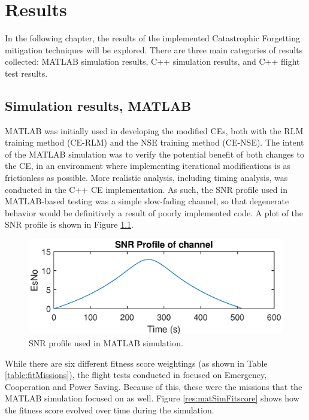 \chapter{Results}\label{ch:results}

\par In the following chapter, the results of the implemented Catastrophic Forgetting mitigation techniques will be explored. There are three main categories of results collected: MATLAB simulation results, C++ simulation results, and C++ flight test results. %
\section{Simulation results, MATLAB}
\par MATLAB was initially used in developing the modified CEs, both with the RLM training method (CE-RLM) and the NSE training method (CE-NSE). The intent of the MATLAB simulation was to verify the potential benefit of both changes to the CE, in an environment where implementing iterational modifications is as frictionless as possible. More realistic analysis, including timing analysis, was conducted in the C++ CE implementation. As such, the SNR profile used in MATLAB-based testing was a simple slow-fading channel, so that degenerate behavior would be definitively a result of poorly implemented code. A plot of the SNR profile is shown in Figure \ref{fig:matlabSNRProf}. 
\begin{figure}[ht]
\centering
\includegraphics[scale=1]{figures/matlab_sim_results/snrPRofile_matlabsim.eps}
\caption{SNR profile used in MATLAB simulation.}
\label{fig:matlabSNRProf}
\end{figure}
\par While there are six different fitness score weightings (as shown in Table \ref{table:fitMissions}), the flight tests conducted in \cite{tim_implementation_paper} focused on Emergency, Cooperation and Power Saving. Because of this, these were the missions that the MATLAB simulation focused on as well. Figure \ref{res:matSimFitscore} shows how the fitness score evolved over time during the simulation.

